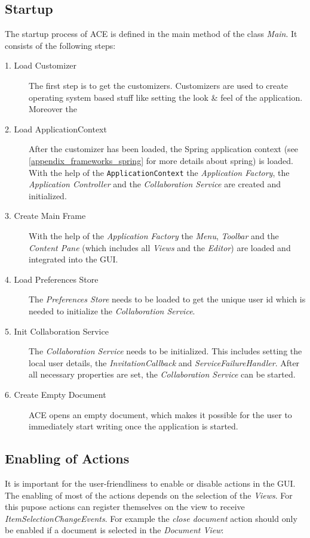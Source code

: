 \subsection{Startup}
\label{applicationlayer_wf_startup}
The startup process of ACE is defined in the main method of the class \textit{Main}. It consists of the following steps:
\begin{description}
\item[1. Load Customizer ] The first step is to get the customizers. Customizers are used to create operating system based stuff like setting the look \& feel of the application. Moreover the 
\item[2. Load ApplicationContext ] After the customizer has been loaded, the Spring application context (see \ref{appendix_frameworks_spring} for more details about spring) is loaded. With the help of the \texttt{Application\-Context} the \textit{Application Factory}, the \textit{Application Controller} and the \textit{Collaboration Service} are created and initialized.
\item[3. Create Main Frame ] With the help of the \textit{Application Factory} the \textit{Menu}, \textit{Toolbar} and the \textit{Content Pane} (which includes all \textit{Views} and the \textit{Editor}) are loaded and integrated into the GUI.
\item[4. Load Preferences Store ] The \textit{Preferences Store} needs to be loaded to get the unique user id which is needed to initialize the \textit{Collaboration Service}.
\item[5. Init Collaboration Service ] The \textit{Collaboration Service} needs to be initialized. This includes setting the local user details, the \textit{InvitationCallback} and \textit{ServiceFailureHandler}. After all necessary properties are set, the \textit{Collaboration Service} can be started.
\item[6. Create Empty Document ] ACE opens an empty document, which makes it possible for the user to immediately start writing once the application is started.
\end{description}

\subsection{Enabling of Actions}
It is important for the user-friendliness to enable or disable actions in the GUI. The enabling of most of the actions depends on the selection of the \textit{Views}. For this pupose actions can register themselves on the view to receive \textit{Item\-Selection\-Change\-Events}.  For example the \textit{close document} action should only be enabled if a document is selected in the \textit{Document View}:

